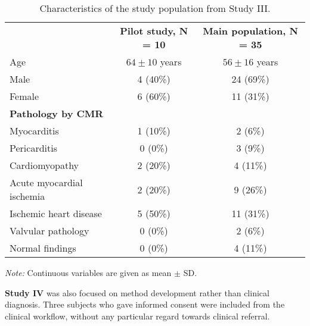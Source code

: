 \begin{table}[tbp]
\caption{Characteristics of the study population from Study III.}
\begin{center}
\begin{threeparttable}
\begin{tabular}{l c c}
     \mydarkrowcolor~ & \textbf{Pilot study, N = 10} & \textbf{Main population, N = 35}\\
     Age & $64 \pm 10$ years & $56 \pm 16$ years \\
     \myrowcolor Male & 4 (40\%) & 24 (69\%) \\
      Female & 6 (60\%) & 11 (31\%)\\
     \mydarkrowcolor \textbf{Pathology by CMR} & & \\
     Myocarditis & 1 (10\%) & 2 (6\%) \\
     \myrowcolor Pericarditis & 0 (0\%) & 3 (9\%) \\
     Cardiomyopathy & 2 (20\%)& 4 (11\%)\\
     \myrowcolor Acute myocardial ischemia &2 (20\%) & 9 (26\%) \\
     Ischemic heart disease &5 (50\%) & 11 (31\%)\\
     \myrowcolor Valvular pathology & 0 (0\%) & 2 (6\%)\\
     Normal findings & 0 (0\%) & 4 (11\%) \\
     \bottomrule
\end{tabular}
\begin{tablenotes}
\emph{Note:} Continuous variables are given as mean $\pm$ SD.
\end{tablenotes}
\end{threeparttable}
\end{center}
\label{table:study3pop}
\end{table}

\textbf{Study IV} was also focused on method development rather than clinical diagnosis. Three subjects who gave informed consent were included from the clinical workflow, without any particular regard towards clinical referral.

